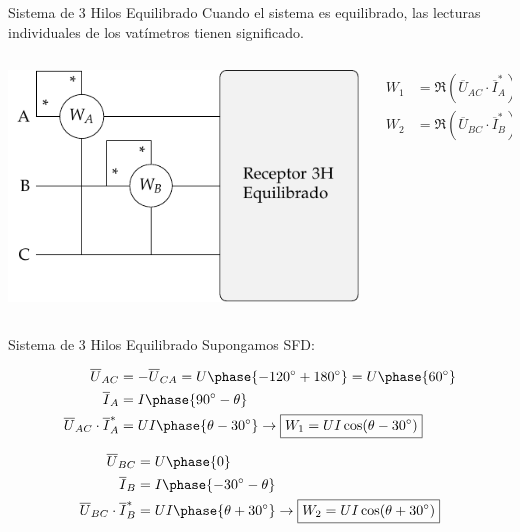 \documentclass[aspectratio=169, usenames,svgnames,dvipsnames]{beamer}
\begin{document}
\begin{frame}[label={sec:orge3ae16a}]{Sistema de 3 Hilos Equilibrado}
Cuando el sistema es equilibrado, las lecturas individuales de los vatímetros tienen significado.


\begin{columns}
\begin{column}{0.7\columnwidth}
\begin{center}
\includegraphics[width=.9\linewidth]{../figs/Potencia3H_Equilibrado_AB.pdf}
\end{center}
\end{column}

\begin{column}{0.3\columnwidth}
\begin{align*}
  W_1 &= \Re(\overline{U}_{AC} \cdot \overline{I}^*_A) = ?\\
  W_2 &= \Re(\overline{U}_{BC} \cdot \overline{I}^*_B) = ?\\
\end{align*}
\end{column}
\end{columns}
\end{frame}


\begin{frame}[label={sec:org3291a5b}]{Sistema de 3 Hilos Equilibrado}
Supongamos SFD:

\begin{align*}
  \overline{U}_{AC} &= - \overline{U}_{CA} = U\phase{\ang{-120} + \ang{180}} = U\phase{\ang{60}}\\
  \overline{I}_A &= I\phase{\ang{90} - \theta}\\
  \overline{U}_{AC} \cdot \overline{I}^*_A &= UI\phase{\theta - \ang{30}} \rightarrow   \boxed{W_1 = UI\cos(\theta - \ang{30})}
\end{align*}

\begin{align*}
  \overline{U}_{BC} &=  U\phase{0}\\
  \overline{I}_B &= I\phase{\ang{-30} - \theta}\\
  \overline{U}_{BC} \cdot \overline{I}^*_B &= UI\phase{\theta + \ang{30}} \rightarrow   \boxed{W_2 = UI\cos(\theta + \ang{30})}
\end{align*}
\end{frame}
\end{document}

